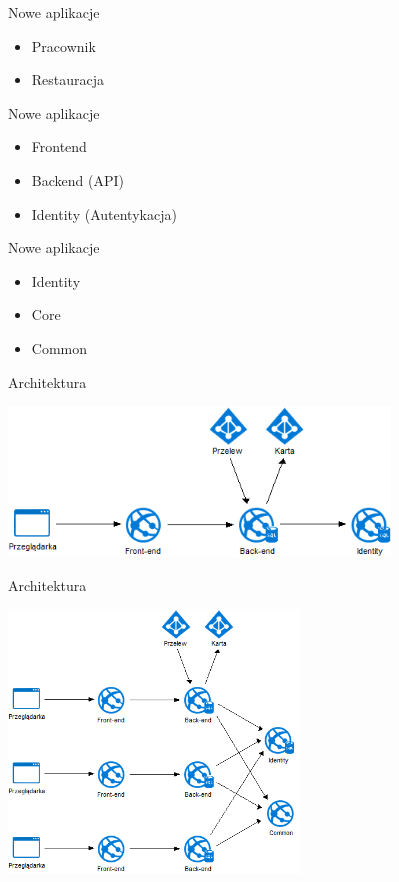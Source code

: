 \documentclass{beamer}
\begin{document}
\begin{frame}{Nowe aplikacje}
	\begin{huge}
		\begin{itemize}[<+->]
			\item Pracownik
			\item Restauracja
		\end{itemize}
	\end{huge}
\end{frame}

\begin{frame}{Nowe aplikacje}
	\begin{huge}
		\begin{itemize}
			\item Frontend
			\item Backend (API)
			\item Identity (Autentykacja)
		\end{itemize}
	\end{huge}
\end{frame}

\begin{frame}{Nowe aplikacje}
	\begin{huge}
		\begin{itemize}[<+->]
			\item Identity
			\item Core
			\item Common
		\end{itemize}
	\end{huge}
\end{frame}

\begin{frame}{Architektura}
	\begin{center}
		\includegraphics[height=4cm]{architektura1.png}
	\end{center}
\end{frame}

\begin{frame}{Architektura}
	\begin{center}
		\includegraphics[height=7cm]{architektura2.png}
	\end{center}
\end{frame}
\end{document}
